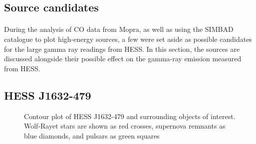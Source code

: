 \documentclass[a4paper, titlepage, oneside]{article}
\begin{document}
\begin{multicols}{2}
\section{Source candidates} %
\paragraph{}
During the analysis of CO data from Mopra, as well as using the SIMBAD catalogue to plot high-energy sources, a few were set aside as possible candidates for the large gamma ray readings from HESS. In this section, the sources are discussed alongside their possible effect on the gamma-ray emission measured from HESS.

\subsection{HESS J1632-479}

\begin{figure}[H]
  \centering
  \caption{Contour plot of HESS J1632-479 and surrounding objects of interest. Wolf-Rayet stars are shown as red crosses, supernova remnants as blue diamonds, and pulsars as green squares}
  \label{fig:hess32}
\end{figure}


\end{multicols}
\end{document}
